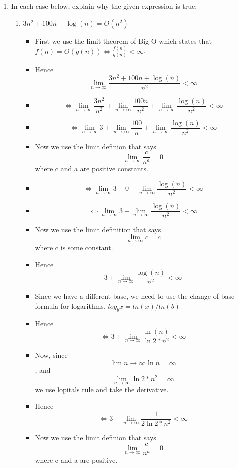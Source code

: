 \begin{enumerate}
\item In each case below, explain why the given expression is true:
  \begin{enumerate}
  \item $3n^{2} + 100n + \log{(n)} = O(n^{2})$
    \begin{itemize}
    \item [] First we use the limit theorem of Big O which states that $f(n)=O(g(n)) \Leftrightarrow \frac{f(n)}{g(n)} < \infty$.
    \item [] Hence {\Large $$\lim_{n \to \infty} \frac{3n^{2} +100n +\log{(n)}}{n^{2}} < \infty$$}
    \item [] {\Large $$\Leftrightarrow \lim_{n \to \infty} \frac{3n^{2}}{n^{2}} + \lim_{n \to \infty} \frac{100n}{n^{2}} + \lim_{n \to \infty} \frac{\log{(n)}}{n^{2}} < \infty$$}
    \item [] {\Large $$\Leftrightarrow \lim_{n \to \infty} 3 + \lim_{n \to \infty} \frac{100}{n} + \lim_{n \to \infty} \frac{\log{(n)}}{n^{2}} < \infty$$}
    \item [] Now we use the limit definion that says {\Large $$\lim_{n \to \infty} \frac{c}{n^{a}} =0$$} where c and a are positive constants.
    \item [] {\Large $$\Leftrightarrow \lim_{n \to \infty} 3 +0+ \lim_{n \to \infty} \frac{\log{(n)}}{n^{2}} < \infty$$}
    \item [] {\Large $$\Leftrightarrow \lim_{n \to \infty} 3 + \lim_{n \to \infty} \frac{\log{(n)}}{n^{2}} < \infty$$}
    \item [] Now we use the limit definition that says $$\lim_{n \to \infty} c = c$$ where c is some constant.
    \item [] Hence {\Large $$3 + \lim_{n \to \infty} \frac{\log{(n)}}{n^{2}} < \infty$$}
    \item [] Since we have a different base, we need to use the change of base formula for logarithms. $log_{b}x =ln(x)/ln(b)$
    \item [] Hence {\Large $$\Leftrightarrow 3 + \lim_{n \to \infty} \frac{\ln{(n)}}{\ln{2}*n^{2}} < \infty$$}
    \item [] Now, since $$\lim{n \to \infty} \ln{n} = \infty$$, and $$\lim_{n \to \infty} \ln{2}*n^{2} = \infty$$ we use lopitals rule and take the derivative. 
    \item [] Hence {\Large $$\Leftrightarrow 3 + \lim_{n \to \infty} \frac{1}{2\ln{2}*n^{2}} < \infty$$}
    \item [] Now we use the limit definion that says {\Large $$\lim_{n \to \infty} \frac{c}{n^{a}} =0$$} where c and a are positive.

\end{itemize}
\end{enumerate}
\end{enumerate}
